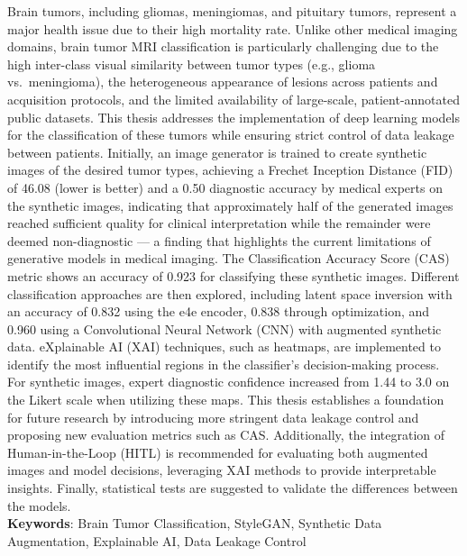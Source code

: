 \documentclass[
	spanish, %
	letterpaper, oneside
]{book}
\begin{document}
\templatePortrait

\templatePagecfg


\begin{abstractd}
Brain tumors, including gliomas, meningiomas, and pituitary tumors, represent a major health issue due to their high mortality rate. Unlike other medical imaging domains, brain tumor MRI classification is particularly challenging due to the high inter-class visual similarity between tumor types (e.g., glioma vs.\ meningioma), the heterogeneous appearance of lesions across patients and acquisition protocols, and the limited availability of large-scale, patient-annotated public datasets. This thesis addresses the implementation of deep learning models for the classification of these tumors while ensuring strict control of data leakage between patients. Initially, an image generator is trained to create synthetic images of the desired tumor types, achieving a Fr\’echet Inception Distance (FID) of 46.08 (lower is better) and a 0.50 diagnostic accuracy by medical experts on the synthetic images, indicating that approximately half of the generated images reached sufficient quality for clinical interpretation while the remainder were deemed non-diagnostic --- a finding that highlights the current limitations of generative models in medical imaging. The Classification Accuracy Score (CAS) metric shows an accuracy of 0.923 for classifying these synthetic images. Different classification approaches are then explored, including latent space inversion with an accuracy of 0.832 using the e4e encoder, 0.838 through optimization, and 0.960 using a Convolutional Neural Network (CNN) with augmented synthetic data. eXplainable AI (XAI) techniques, such as heatmaps, are implemented to identify the most influential regions in the classifier’s decision-making process. For synthetic images, expert diagnostic confidence increased from 1.44 to 3.0 on the Likert scale when utilizing these maps. This thesis establishes a foundation for future research by introducing more stringent data leakage control and proposing new evaluation metrics such as CAS. Additionally, the integration of Human-in-the-Loop (HITL) is recommended for evaluating both augmented images and model decisions, leveraging XAI methods to provide interpretable insights. Finally, statistical tests are suggested to validate the differences between the models.\\

\textbf{Keywords}: Brain Tumor Classification, StyleGAN, Synthetic Data Augmentation, Explainable AI, Data Leakage Control
\end{abstractd}
\end{document}
